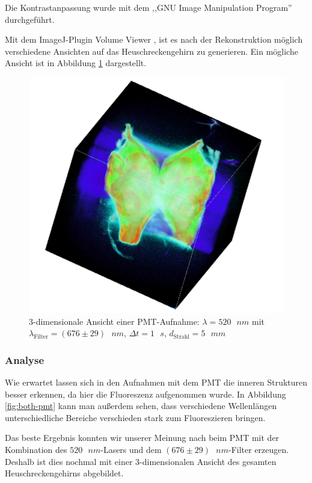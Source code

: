 Die Kontrastanpassung wurde mit dem ,,GNU Image Manipulation Program'' durchgeführt.

Mit dem ImageJ-Plugin \glqq Volume Viewer\grqq{} , ist es nach der Rekonstruktion möglich verschiedene Ansichten auf das Heuschreckengehirn zu generieren. Ein mögliche Ansicht ist in Abbildung \ref{fig:3d} dargestellt.

\begin{figure}[H]
\centering
\includegraphics[width=\linewidth]{IMAGE/3dtomo.png}
\caption{3-dimensionale Ansicht einer PMT-Aufnahme: $\lambda = 520 \text{ } \si{nm}$ mit\\ $\lambda_\text{Filter} = (676 \pm 29) \text{ } \si{nm}$, $\Delta{t} = 1 \text{ } \si{s}$, $d_\text{Strahl} = 5 \text{ } \si{mm}$}
	\label{fig:3d}
\end{figure}


\subsubsection{Analyse}
Wie erwartet lassen sich in den Aufnahmen mit dem PMT die inneren Strukturen besser erkennen, da hier die Fluoreszenz aufgenommen wurde.
In Abbildung \ref{fig:both-pmt} kann man außerdem sehen, dass verschiedene Wellenlängen unterschiedliche Bereiche verschieden stark zum Fluoreszieren bringen.

Das beste Ergebnis konnten wir unserer Meinung nach beim PMT mit der Kombination des $520\text{ } \si{nm}$-Lasers und dem $(676 \pm 29)\text{ } \si{nm}$-Filter erzeugen.
Deshalb ist dies nochmal mit einer 3-dimensionalen Ansicht des gesamten Heuschreckengehirns abgebildet.

